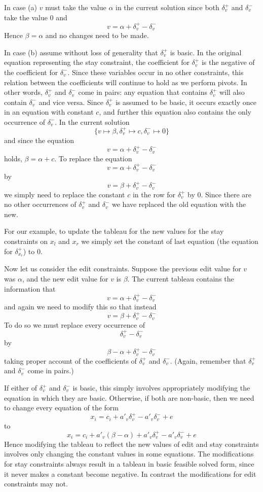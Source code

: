 \documentclass{article}
\begin{document}
In case (a) $v$ must take the value $\alpha$
in the current solution since both $\delta_v^+$ and 
$\delta_v^-$ take the value $0$ and 
$$v = \alpha + \delta_v^+ - \delta_v^-$$
Hence $\beta = \alpha$ and no changes need to be made.

In case (b) assume without loss of generality that $\delta_v^+$ is
basic.  In the original equation representing the stay constraint, the
coefficient for $\delta_v^+$ is the negative of the coefficient for
$\delta_v^-$.  Since these variables occur in no other constraints, this
relation between the coefficients will continue to hold as we perform
pivots.  In other words, $\delta_v^+$ and $\delta_v^-$ come in pairs: any
equation that contains $\delta_v^+$ will also contain $\delta_v^-$ and vice
versa.  Since $\delta_v^+$ is assumed to be basic, it occurs exactly once
in an equation with constant $c$, and further this equation also contains
the only occurrence of $\delta_v^-$.  In the current solution 
$$\{v \mapsto \beta, \delta_v^+ \mapsto c, \delta_v^- \mapsto 0\}$$
and since the
equation 
$$v = \alpha + \delta_v^+ - \delta_v^-$$
holds, $\beta = \alpha + c$.  To replace the equation 
$$v = \alpha + \delta_v^+ - \delta_v^-$$
by  
$$v = \beta + \delta_v^+ - \delta_v^-$$
we simply need to replace the constant $c$
in the row for $\delta_v^+$ by $0$.  Since there are no other 
occurrences of $\delta_v^+$
and $\delta_v^-$ we have replaced the old equation with the new.

For our example, to update the tableau for the new values for the stay
constraints on $x_l$ and $x_r$ we simply set the constant of last equation
(the equation for $\delta_{x_r}^+$) to 0.

Now let us consider the edit constraints.  Suppose the previous edit value
for $v$ was $\alpha$, and the new edit value for $v$ is $\beta$.  The
current tableau contains the information that 
$$v = \alpha + \delta_v^+ - \delta_v^-$$
and again we need to modify this so that instead 
$$v = \beta + \delta_v^+ - \delta_v^-$$
To do so we must replace every occurrence of 
$$\delta_v^+ - \delta_v^-$$
by 
$$\beta - \alpha + \delta_v^+ - \delta_v^-$$
taking proper account of the coefficients of $\delta_v^+$ and $\delta_v^-$.
(Again, remember that $\delta_v^+$ and $\delta_v^-$ come in pairs.)

If either of $\delta_v^+$ and $\delta_v^-$ is basic, this simply involves
appropriately modifying the equation in which they are basic.  Otherwise, if
both are non-basic, then we need to change every equation of the form
$$
x_i = c_i + a'_v \delta_v^+ - a'_v \delta_v^- + e
$$
to
$$
x_i = c_i + a'_v (\beta - \alpha) + a'_v \delta_v^+ - a'_v \delta_v^- + e
$$
Hence modifying the tableau to reflect the new values of edit and stay
constraints involves only changing the constant values in some equations.
The modifications for stay constraints always result in a tableau in basic
feasible solved form, since it never makes a constant become negative.
In contrast the modifications for edit constraints may not.
\end{document}
